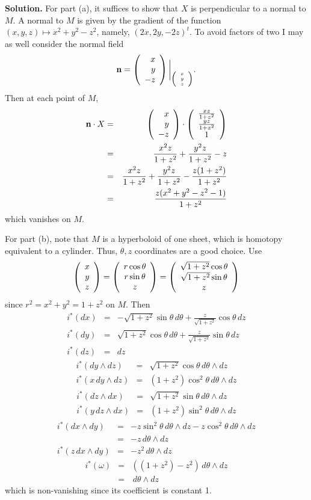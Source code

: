 \documentclass[10pt]{article}
\numberwithin{equation}{subsection}
\begin{document}
\textbf{Solution.}  For part (a), it suffices to show that $X$ is perpendicular
to a normal to $M$.  A normal to $M$ is given by the gradient of the function
$(x,y,z)\mapsto x^2+y^2-z^2$, namely, $(2x, 2y, -2z)^t$.  To avoid factors of
two I may as well consider the normal field
$$
	\mathbf{n} = \left(\begin{array}{r} x \\ y \\ -z\end{array}\right)\bigg|_{\tiny{\left(\begin{array}{r} x \\ y \\ z\end{array}\right)}}.
$$
Then at each point of $M$,
\begin{eqnarray*}
	\mathbf{n} \cdot X &=& \left(\begin{array}{r} x \\ y \\ -z\end{array}\right) \cdot
		\left(\begin{array}{c} \frac{xz}{1+z^2} \\ \frac{yz}{1+z^2} \\ 1\end{array}\right) \\
	&=& \frac{x^2z}{1+z^2} + \frac{y^2z}{1+z^2} - z \\
	&=& \frac{x^2z}{1+z^2} + \frac{y^2z}{1+z^2} - \frac{z(1+z^2)}{1+z^2} \\
	&=& \frac{z(x^2+y^2-z^2-1)}{1+z^2}
\end{eqnarray*}
which vanishes on $M$.

For part (b), note that $M$ is a hyperboloid of one sheet, which is homotopy
equivalent to a cylinder.  Thus, $\theta,z$ coordinates are a good choice.  Use
$$
	\left(\begin{array}{c} x \\ y \\ z\end{array}\right) = \left(\begin{array}{c} r\cos\theta \\ r\sin\theta \\ z\end{array}\right)
	= \left(\begin{array}{c} \sqrt{1+z^2}\cos\theta \\ \sqrt{1+z^2}\sin\theta \\ z\end{array}\right)
$$
since $r^2=x^2+y^2=1+z^2$ on $M$.  Then
\begin{eqnarray*}
	i^*(dx) &=& -\sqrt{1+z^2}\sin\theta \,d\theta + \frac{z}{\sqrt{1+z^2}}\cos\theta \,dz \\
	i^*(dy) &=&  \sqrt{1+z^2}\cos\theta \,d\theta + \frac{z}{\sqrt{1+z^2}}\sin\theta \,dz \\
	i^*(dz) &=& dz
\end{eqnarray*}
\begin{eqnarray*}
	i^*(    dy \wedge dz) &=& \sqrt{1+z^2}\cos\theta \,d\theta \wedge dz \\
	i^*(x\, dy \wedge dz) &=& (1+z^2)\cos^2\theta \,d\theta \wedge dz
\end{eqnarray*}
\begin{eqnarray*}
	i^*(    dz \wedge dx) &=& \sqrt{1+z^2}\sin\theta \,d\theta \wedge dz \\
	i^*(y\, dz \wedge dx) &=& (1+z^2)\sin^2\theta \,d\theta \wedge dz
\end{eqnarray*}
\begin{eqnarray*}
	i^*(    dx \wedge dy) &=& -z \sin^2\theta \, d\theta\wedge dz
		-z \cos^2\theta \, d\theta\wedge dz \\
	&=& -z \, d\theta\wedge dz \\
	i^*(z\, dx \wedge dy) &=& -z^2 \, d\theta\wedge dz
\end{eqnarray*}
\begin{eqnarray*}
	i^*(\omega) &=& \left( (1+z^2) -z^2 \right) \,d\theta\wedge dz \\
	&=& \,d\theta\wedge dz
\end{eqnarray*}
which is non-vanishing since its coefficient is constant 1.
\end{document}
